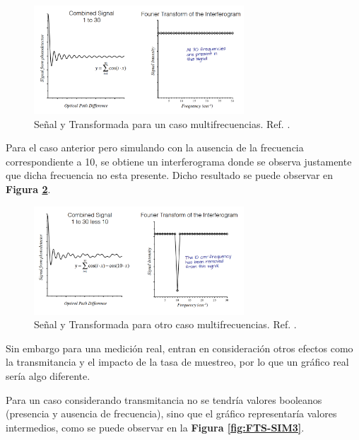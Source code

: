 \documentclass[11pt,titlepage]{article}
\begin{document}
\FloatBarrier
    \begin{figure}[ht!]
    \centering
    \includegraphics[width=0.7\textwidth]{fig/FTS-SIM1.png}
    \caption{Señal y Transformada para un caso multifrecuencias. Ref. \cite{FTS}.}
    \label{fig:FTS-SIM1}
\end{figure}

Para el caso anterior pero simulando con la ausencia de la frecuencia correspondiente a 10, se obtiene un interferograma donde se observa justamente que dicha frecuencia no esta presente. Dicho resultado se puede observar en \textbf{Figura \ref{fig:FTS-SIM2}}.\par
\FloatBarrier
    \begin{figure}[ht!]
    \centering
    \includegraphics[width=0.7\textwidth]{fig/FTS-SIM2.png}
    \caption{Señal y Transformada para otro caso multifrecuencias. Ref. \cite{FTS}.}
    \label{fig:FTS-SIM2}
\end{figure}

Sin embargo para una medición real, entran en consideración otros efectos como la transmitancia y el impacto de la tasa de muestreo, por lo que un gráfico real sería algo diferente.\par
Para un caso considerando transmitancia no se tendría valores booleanos (presencia y ausencia de frecuencia), sino que el gráfico representaría valores intermedios, como se puede observar en la \textbf{Figura \ref{fig:FTS-SIM3}}. %
\end{document}
